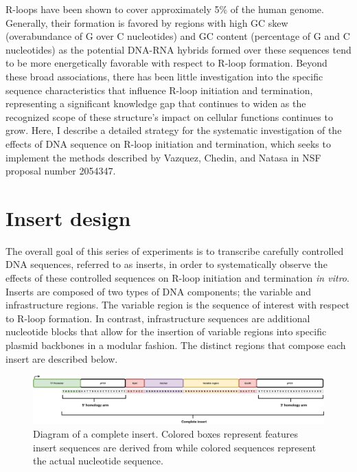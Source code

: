\documentclass[11pt]{article}
\begin{document}
R-loops have been shown to cover approximately 5\% of the human genome. Generally, their formation is favored by regions with high GC skew (overabundance of G over C nucleotides) and GC content (percentage of G and C nucleotides) as the potential DNA-RNA hybrids formed over these sequences tend to be more energetically favorable with respect to R-loop formation\cite{Stolz2019}. Beyond these broad associations, there has been little investigation into the specific sequence characteristics that influence R-loop initiation and termination, representing a significant knowledge gap that continues to widen as the recognized scope of these structure's impact on cellular functions continues to grow. Here, I describe a detailed strategy for the systematic investigation of the effects of DNA sequence on R-loop initiation and termination, which seeks to implement the methods described by Vazquez, Chedin, and Natasa in NSF proposal number 2054347. 


\section{Insert design}

The overall goal of this series of experiments is to transcribe carefully controlled DNA sequences, referred to as inserts, in order to systematically observe the effects of these controlled sequences on R-loop initiation and termination \emph{in vitro}. Inserts are composed of two types of DNA components; the variable and infrastructure regions. The variable region is the sequence of interest with respect to R-loop formation. In contrast, infrastructure sequences are additional nucleotide blocks that allow for the insertion of variable regions into specific plasmid backbones in a modular fashion. The distinct regions that compose each insert are described below. 

\begin{figure}[H]
	\includegraphics[width=16cm]{images/variable_region/construct_diagrams-Detailed-Insert.png}
	\centering
	\caption{Diagram of a complete insert. Colored boxes represent features insert sequences are derived from while colored sequences represent the actual nucleotide sequence.}
	\label{figure:1}
\end{figure}
\end{document}
